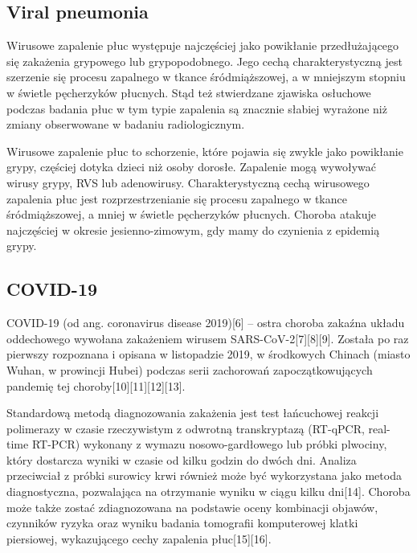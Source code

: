 \documentclass{article}
\begin{document}
\subsection{Viral pneumonia}
Wirusowe zapalenie płuc występuje najczęściej jako powikłanie przedłużającego się zakażenia grypowego lub grypopodobnego. Jego cechą charakterystyczną jest szerzenie się procesu zapalnego w tkance śródmiąższowej, a w mniejszym stopniu w świetle pęcherzyków płucnych. Stąd też stwierdzane zjawiska osłuchowe podczas badania płuc w tym typie zapalenia są znacznie słabiej wyrażone niż zmiany obserwowane w badaniu radiologicznym.

Wirusowe zapalenie płuc to schorzenie, które pojawia się zwykle jako powikłanie grypy, częściej dotyka dzieci niż osoby dorosłe. Zapalenie mogą wywoływać wirusy grypy, RVS lub adenowirusy. Charakterystyczną cechą wirusowego zapalenia płuc jest rozprzestrzenianie się procesu zapalnego w tkance śródmiąższowej, a mniej w świetle pęcherzyków płucnych. Choroba atakuje najczęściej w okresie jesienno-zimowym, gdy mamy do czynienia z epidemią grypy.

\subsection{COVID-19}
COVID-19 (od ang. coronavirus disease 2019)[6] – ostra choroba zakaźna układu oddechowego wywołana zakażeniem wirusem SARS-CoV-2[7][8][9]. Została po raz pierwszy rozpoznana i opisana w listopadzie 2019, w środkowych Chinach (miasto Wuhan, w prowincji Hubei) podczas serii zachorowań zapoczątkowujących pandemię tej choroby[10][11][12][13].

Standardową metodą diagnozowania zakażenia jest test łańcuchowej reakcji polimerazy w czasie rzeczywistym z odwrotną transkryptazą (RT-qPCR, real-time RT-PCR) wykonany z wymazu nosowo-gardłowego lub próbki plwociny, który dostarcza wyniki w czasie od kilku godzin do dwóch dni. Analiza przeciwciał z próbki surowicy krwi również może być wykorzystana jako metoda diagnostyczna, pozwalająca na otrzymanie wyniku w ciągu kilku dni[14]. Choroba może także zostać zdiagnozowana na podstawie oceny kombinacji objawów, czynników ryzyka oraz wyniku badania tomografii komputerowej klatki piersiowej, wykazującego cechy zapalenia płuc[15][16].
\end{document}
